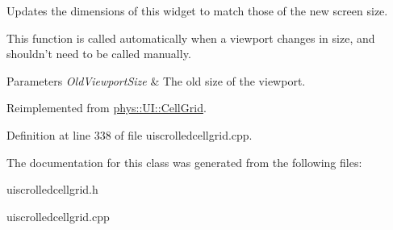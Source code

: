 Updates the dimensions of this widget to match those of the new screen size. 

This function is called automatically when a viewport changes in size, and shouldn't need to be called manually. 
\begin{DoxyParams}{Parameters}
{\em OldViewportSize} & The old size of the viewport. \\
\hline
\end{DoxyParams}


Reimplemented from \hyperlink{classphys_1_1UI_1_1CellGrid_addbc1338b3b321018cbaf3ff787837e5}{phys::UI::CellGrid}.



Definition at line 338 of file uiscrolledcellgrid.cpp.



The documentation for this class was generated from the following files:\begin{DoxyCompactItemize}
\item 
uiscrolledcellgrid.h\item 
uiscrolledcellgrid.cpp\end{DoxyCompactItemize}
